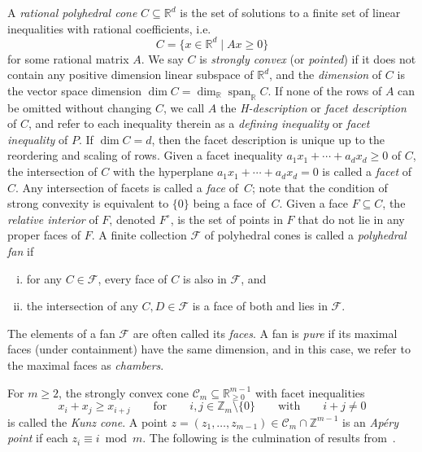 \documentclass[10pt,a4paper]{amsart}
\newcommand\ZZ{\mathbb{Z}}
\newcommand\RR{\mathbb{R}}
\newcommand\cC{{\mathcal C}}
\DeclareMathOperator\Span{span}
\theoremstyle{definition}\newtheorem{defi}[thm]{Definition}
\begin{document}
\setcounter{thm}{2}
A \emph{rational polyhedral cone} $C \subseteq \RR^d$ is the set of solutions to a finite set of linear inequalities with rational coefficients, i.e.
\[
C = \{x \in \RR^d \mid Ax \ge 0\}
\]
for some rational matrix $A$.  We say $C$ is \emph{strongly convex} (or \emph{pointed}) if it does not contain any positive dimension linear subspace of $\RR^d$, and the \emph{dimension} of $C$ is the vector space dimension $\dim C = \dim_\RR \Span_{\RR}C$. If none of the rows of $A$ can be omitted without changing $C$, we call $A$ the \emph{H-description} or \emph{facet description} of $C$, and refer to each inequality therein as a \emph{defining inequality} or \emph{facet inequality} of $P$.  If $\dim C = d$, then the facet description is unique up to the reordering and scaling of rows.  
Given a facet inequality $a_1x_1 + \cdots + a_dx_d \geq 0$ of $C$, the intersection of $C$ with the hyperplane $a_1x_1 + \cdots + a_dx_d = 0$ is called a \emph{facet} of $C$. Any intersection of facets is called a \emph{face} of~$C$; note that the condition of strong convexity is equivalent to $\{0\}$ being a face of~$C$. Given a face $F \subseteq C$, the \emph{relative interior} of $F$, denoted $F^{\circ}$, is the set of points in $F$ that do not lie in any proper faces of $F$.
A finite collection $\mathcal F$ of polyhedral cones is called a \emph{polyhedral fan} if 
\begin{enumerate}[(i)]
\item 
for any $C \in \mathcal{F}$, every face of $C$ is also in $\mathcal{F}$, and

\item 
the intersection of any $C,D \in \mathcal{F}$ is a face of both and lies in $\mathcal F$.

\end{enumerate}
The elements of a fan $\mathcal F$ are often called its \emph{faces}.  
A fan is \emph{pure} if its maximal faces (under containment) have the same dimension, and in this case, we refer to the maximal faces as \emph{chambers}.  

For $m \geq 2$, the strongly convex cone $\cC_m \subseteq \RR^{m-1}_{\geq 0}$ with facet inequalities
\[
x_i + x_j \geq x_{i+j}
\qquad \text{for} \qquad
i,j \in \ZZ_m \setminus \{0\}
\qquad \text{with} \qquad
i + j \ne 0
\]
is called the \emph{Kunz cone}.  
A point $z = (z_1, \ldots, z_{m-1}) \in \cC_{m} \cap \ZZ^{m-1}$ is an \emph{Ap\'ery point} if each $z_i \equiv i \bmod m$.  
The following is the culmination of results from~\cite{kunzfaces3,kunzfaces1,kunz}.  
\end{document}
